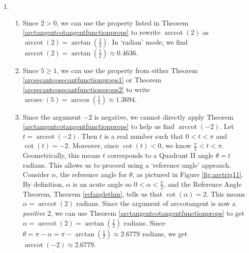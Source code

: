 {
\begin{enumerate}

\item

\begin{enumerate}

\item  Since $2 > 0$, we can use the property listed in Theorem \ref{arctangentcotangentfunctionprops} to rewrite $\operatorname{arccot}(2)$ as $\operatorname{arccot}(2) = \arctan\left(\frac{1}{2}\right)$.  In `radian' mode, we find $\operatorname{arccot}(2) = \arctan\left(\frac{1}{2}\right) \approx 0.4636$.

\item  Since $5 \geq 1$, we can use the property from either Theorem \ref{arcsecantcosecantfunctionprops1} or Theorem \ref{arcsecantcosecantfunctionprops2} to write $\operatorname{arcsec}(5) = \arccos\left(\frac{1}{5}\right) \approx 1.3694$.





\item  Since the argument $-2$ is negative, we cannot directly apply  Theorem \ref{arctangentcotangentfunctionprops} to help us find  $\operatorname{arccot}(-2)$.  Let $t = \operatorname{arccot}(-2)$. Then $t$ is a real number such that $0 < t < \pi$ and $\cot(t) = -2$.  Moreover, since $\cot(t) < 0$, we know $\frac{\pi}{2} < t < \pi$.  Geometrically, this means $t$ corresponds to a Quadrant II angle $\theta = t$ radians.  This allows us to proceed using a `reference angle' approach. Consider $\alpha$, the reference angle for $\theta$, as pictured in Figure \ref{fig:arctrig11}. By definition, $\alpha$ is an acute angle so  $0 < \alpha < \frac{\pi}{2}$, and the Reference Angle Theorem, Theorem \ref{refanglethm}, tells us that $\cot(\alpha) = 2$.  This means  $\alpha = \operatorname{arccot}(2)$ radians.  Since the argument of arccotangent is now a \emph{positive} $2$, we can use  Theorem \ref{arctangentcotangentfunctionprops} to get $\alpha = \operatorname{arccot}(2) =\arctan\left(\frac{1}{2}\right)$ radians. Since $\theta = \pi - \alpha =  \pi - \arctan\left(\frac{1}{2}\right) \approx 2.6779$ radians, we get  $\operatorname{arccot}(-2) \approx 2.6779$.


\end{enumerate}
\end{enumerate}}
